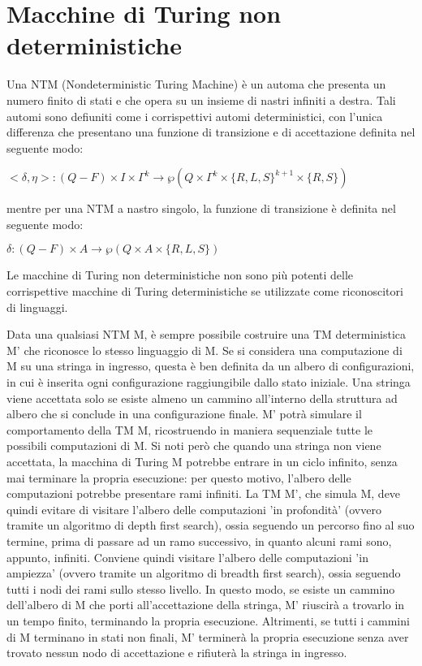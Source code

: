   \section{Macchine di Turing non deterministiche}
  Una NTM (Nondeterministic Turing Machine) è un automa che presenta un numero finito di stati e che opera su un insieme di nastri infiniti a destra. Tali automi sono defiuniti come i corrispettivi automi deterministici, con l'unica differenza che presentano una funzione di transizione e di accettazione definita nel seguente modo:

  \(<\delta, \eta>:(Q-F)\times I\times \Gamma^k\to\wp(Q\times\Gamma^k\times\{R,L,S\}^{k+1}\times\{R,S\})\)
  
  \noindent
  mentre per una NTM a nastro singolo, la funzione di transizione è definita nel seguente modo:

  \(\delta:(Q-F)\times A\to\wp(Q\times A\times\{R,L,S\})\)

  \begin{theorem}
    Le macchine di Turing non deterministiche non sono più potenti delle corrispettive macchine di Turing deterministiche se utilizzate come riconoscitori di linguaggi.
  \end{theorem} 

  Data una qualsiasi NTM M, è sempre possibile costruire una TM deterministica M' che riconosce lo stesso linguaggio di M. Se si considera una computazione di M su una stringa in ingresso, questa è ben definita da un albero di configurazioni, in cui è inserita ogni configurazione raggiungibile dallo stato iniziale. Una stringa viene accettata solo se esiste almeno un cammino all'interno della struttura ad albero che si conclude in una configurazione finale. M' potrà simulare il comportamento della TM M, ricostruendo in maniera sequenziale tutte le possibili computazioni di M. Si noti però che quando una stringa non viene accettata, la macchina di Turing M potrebbe entrare in un ciclo infinito, senza mai terminare la propria esecuzione: per questo motivo, l'albero delle computazioni potrebbe presentare rami infiniti. La TM M', che simula M, deve quindi evitare di visitare l'albero delle computazioni 'in profondità' (ovvero tramite un algoritmo di depth first search), ossia seguendo un percorso fino al suo termine, prima di passare ad un ramo successivo, in quanto alcuni rami sono, appunto, infiniti. Conviene quindi visitare l'albero delle computazioni 'in ampiezza' (ovvero tramite un algoritmo di breadth first search), ossia seguendo tutti i nodi dei rami sullo stesso livello. In questo modo, se esiste un cammino dell'albero di M che porti all'accettazione della stringa, M' riuscirà a trovarlo in un tempo finito, terminando la propria esecuzione. Altrimenti, se tutti i cammini di M terminano in stati non finali, M' terminerà la propria esecuzione senza aver trovato nessun nodo di accettazione e rifiuterà la stringa in ingresso. 